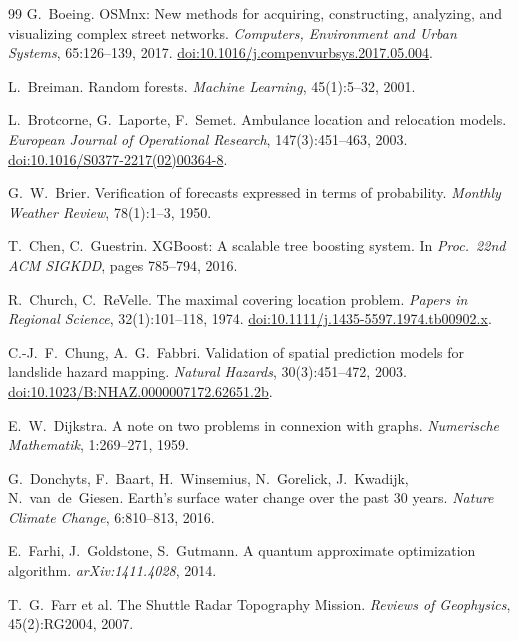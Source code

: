 \documentclass[11pt,a4paper]{article}
\begin{document}
\begin{thebibliography}{99}
G.~Boeing.
OSMnx: New methods for acquiring, constructing, analyzing, and visualizing
complex street networks.
\emph{Computers, Environment and Urban Systems}, 65:126--139, 2017.
\href{https://doi.org/10.1016/j.compenvurbsys.2017.05.004}{doi:10.1016/j.compenvurbsys.2017.05.004}.

L.~Breiman. Random forests. \emph{Machine Learning}, 45(1):5--32, 2001.

L.~Brotcorne, G.~Laporte, F.~Semet.
Ambulance location and relocation models.
\emph{European Journal of Operational Research}, 147(3):451--463, 2003.
\href{https://doi.org/10.1016/S0377-2217(02)00364-8}{doi:10.1016/S0377-2217(02)00364-8}.

G.~W.~Brier.
Verification of forecasts expressed in terms of probability.
\emph{Monthly Weather Review}, 78(1):1--3, 1950.

T.~Chen, C.~Guestrin.
XGBoost: A scalable tree boosting system.
In \emph{Proc.\ 22nd ACM SIGKDD}, pages 785--794, 2016.

R.~Church, C.~ReVelle.
The maximal covering location problem.
\emph{Papers in Regional Science}, 32(1):101--118, 1974.
\href{https://doi.org/10.1111/j.1435-5597.1974.tb00902.x}{doi:10.1111/j.1435-5597.1974.tb00902.x}.

C.-J.~F.~Chung, A.~G.~Fabbri.
Validation of spatial prediction models for landslide hazard mapping.
\emph{Natural Hazards}, 30(3):451--472, 2003.
\href{https://doi.org/10.1023/B:NHAZ.0000007172.62651.2b}{doi:10.1023/B:NHAZ.0000007172.62651.2b}.

E.~W.~Dijkstra.
A note on two problems in connexion with graphs.
\emph{Numerische Mathematik}, 1:269--271, 1959.

G.~Donchyts, F.~Baart, H.~Winsemius, N.~Gorelick, J.~Kwadijk, N.~van~de~Giesen.
Earth's surface water change over the past 30 years.
\emph{Nature Climate Change}, 6:810--813, 2016.

E.~Farhi, J.~Goldstone, S.~Gutmann.
A quantum approximate optimization algorithm.
\emph{arXiv:1411.4028}, 2014.

T.~G.~Farr et al.
The Shuttle Radar Topography Mission.
\emph{Reviews of Geophysics}, 45(2):RG2004, 2007.


\end{thebibliography}
\end{document}
